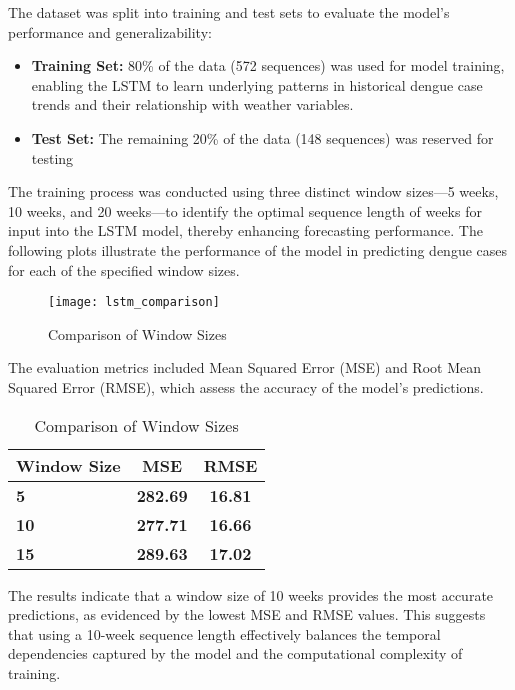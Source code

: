 The dataset was split into training and test sets to evaluate the model’s performance and generalizability:
\begin{itemize}
	\item \textbf{Training Set:} 80\% of the data (572 sequences) was used for model training, enabling the LSTM to learn underlying patterns in historical dengue case trends and their relationship with weather variables.
	\item \textbf{Test Set:} The remaining 20\% of the data (148 sequences) was reserved for testing
\end{itemize}

The training process was conducted using three distinct window sizes—5 weeks, 10 weeks, and 20 weeks—to identify the optimal sequence length of weeks for input into the LSTM model, thereby enhancing forecasting performance. The following plots illustrate the performance of the model in predicting dengue cases for each of the specified window sizes.

\begin{figure}[H]
	\centering
	\texttt{[image: lstm\_comparison]}
	\caption{Comparison of Window Sizes}
	\label{fig:lstm_comparison}
\end{figure}

The evaluation metrics included Mean Squared Error (MSE) and Root Mean Squared Error (RMSE), which assess the accuracy of the model's predictions.
\begin{table}[h!]
	\centering
	\begin{tabular}{|l|c|c|}
		\hline
		\textbf{Window Size} & \textbf{MSE} & \textbf{RMSE} \\ \hline
		\textbf{5} & \textbf{282.69} & \textbf{16.81} \\ \hline
		\textbf{10} & \textbf{277.71} & \textbf{16.66} \\ \hline
		\textbf{15} & \textbf{289.63} & \textbf{17.02} \\ \hline
	\end{tabular}
	\caption{Comparison of Window Sizes}
	\label{tab:comparison_of_lstm}
\end{table}

The results indicate that a window size of 10 weeks provides the most accurate predictions, as evidenced by the lowest MSE and RMSE values. This suggests that using a 10-week sequence length effectively balances the temporal dependencies captured by the model and the computational complexity of training.



